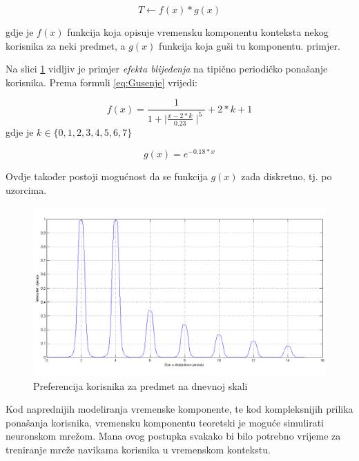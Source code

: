 \documentclass[times, utf8, diplomski, numeric]{fer}
\begin{document}
\begin{equation}
	\label{eq:Gusenje}
	T \leftarrow f(x) \ast g(x)
\end{equation}

gdje je $f(x)$ funkcija koja opisuje vremensku komponentu konteksta nekog
korisnika za neki predmet, a $g(x)$ funkcija koja guši tu komponentu.
primjer. 

Na slici \ref{fig:GaussPriguseno} vidljiv je primjer \emph{efekta
blijeđenja} na tipično periodičko ponašanje korisnika. Prema formuli
\ref{eq:Gusenje} vrijedi:

\begin{equation}
	\label{eq:BellFunc}
	f(x) = \frac
	{
		1
	}
	{
		1 + \mid\frac{x - 2*k}{0.23}\mid^{5}
	}
	+ 2 \ast k + 1
\end{equation}
gdje je $k \in \{ 0, 1, 2, 3, 4, 5, 6, 7 \}$

\begin{equation}
	\label{eq:Prigusnica}
	g(x)=e^{-0.18 * x}
\end{equation}

Ovdje također postoji mogućnost da se funkcija $g(x)$ zada diskretno, tj. po
uzorcima.

\begin{figure}[H]
	\centering
	\includegraphics[width=14.21cm]{images/prigusenocropped.png}
	\caption{Preferencija korisnika za predmet na dnevnoj skali}
	\label{fig:GaussPriguseno}
\end{figure}

Kod naprednijih modeliranja vremenske komponente, te kod kompleksnijih prilika
ponašanja korisnika, vremensku komponentu teoretski je moguće simulirati
neuronskom mrežom. Mana ovog postupka svakako bi bilo potrebno vrijeme za
treniranje mreže navikama korisnika u vremenskom kontekstu.
\end{document}

